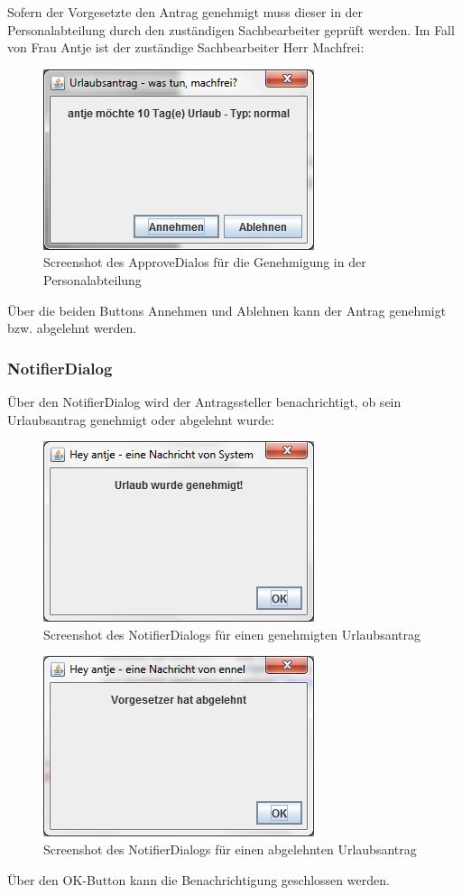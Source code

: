 Sofern der Vorgesetzte den Antrag genehmigt muss dieser in der Personalabteilung durch den zuständigen Sachbearbeiter geprüft werden. Im Fall von Frau Antje ist der zuständige Sachbearbeiter Herr Machfrei:

\begin{figure}[H]
\centering
\includegraphics[width=0.5\linewidth]{Bilder/DialogPersonalabteilungGenehmigung}
\caption{Screenshot des ApproveDialos für die Genehmigung in der Personalabteilung}
\label{fig:DialogPersonalabteilungGenehmigung}
\end{figure}

Über die beiden Buttons Annehmen und Ablehnen kann der Antrag genehmigt bzw. abgelehnt werden.

\subsubsection{NotifierDialog}
Über den NotifierDialog wird der Antragssteller benachrichtigt, ob sein Urlaubsantrag genehmigt oder abgelehnt wurde:

\begin{figure}[H]
\centering
\includegraphics[width=0.5\linewidth]{Bilder/DialogBenachrichtigungGenehmigt}
\caption{Screenshot des NotifierDialogs für einen genehmigten Urlaubsantrag}
\label{fig:DialogBenachrichtigungGenehmigt}
\end{figure}

\begin{figure}[H]
\centering
\includegraphics[width=0.5\linewidth]{Bilder/DialogBenachrichtigungAbgelehnt}
\caption{Screenshot des NotifierDialogs für einen abgelehnten Urlaubsantrag}
\label{fig:DialogBenachrichtigungAbgelehnt}
\end{figure}

Über den OK-Button kann die Benachrichtigung geschlossen werden.


